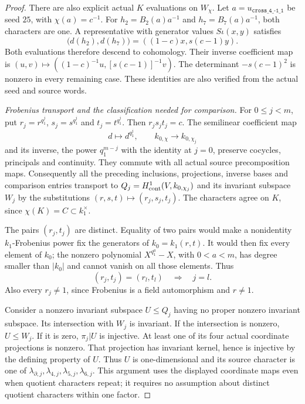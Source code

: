 \begin{proof}
There are also explicit actual $K$ evaluations
on $W_\chi$. Let $a=u_{\texttt{cross\_4\_-1\_1}}$
be seed $25$, with $\chi(a)=c^{-1}$.
For $h_2=B_2(a)a^{-1}$ and $h_7=B_7(a)a^{-1}$,
both characters are one. A representative with
generator values $S\iota(x,y)$ satisfies
\[
 \bigl(d(h_2),d(h_7)\bigr)=((1-c)x,s(c-1)y).
                                                               \tag{F.28.11}
\]
Both evaluations therefore descend to cohomology.
Their inverse coefficient map is
$(u,v)\mapsto((1-c)^{-1}u,[s(c-1)]^{-1}v)$.
The determinant $-s(c-1)^2$ is nonzero in every
remaining case. These identities are also
verified from the actual seed and source words.

\emph{Frobenius transport and the classification needed for comparison.}
For $0\leq j<m$, put
$r_j=r^{q_1^j}$, $s_j=s^{q_1^j}$ and
$t_j=t^{q_1^j}$. Then $r_js_jt_j=c$.
The semilinear coefficient map
\[
             d\longmapsto d^{q_1^j},\qquad
             k_{0,\chi}\longrightarrow k_{0,\chi_j}
                                                               \tag{F.28.12}
\]
and its inverse, the power $q_1^{m-j}$ with the
identity at $j=0$, preserve cocycles, principals
and continuity. They commute with all actual
source precomposition maps. Consequently all
the preceding inclusions, projections, inverse
bases and comparison entries transport to
$Q_j=H^1_{\rm cont}(V,k_{0,\chi_j})$ and its
invariant subspace $W_j$ by the substitutions
$(r,s,t)\mapsto(r_j,s_j,t_j)$.
The characters agree on $K$, since
$\chi(K)=C\subset k_1^\times$.

The pairs $(r_j,t_j)$ are distinct. Equality of
two pairs would make a nonidentity $k_1$-Frobenius
power fix the generators of $k_0=k_1(r,t)$.
It would then fix every element of $k_0$;
the nonzero polynomial $X^{q_1^a}-X$, with
$0<a<m$, has degree smaller than $|k_0|$ and
cannot vanish on all those elements. Thus
\[
                  (r_j,t_j)=(r_l,t_l)\quad\Longrightarrow\quad j=l.
                                                               \tag{F.28.13}
\]
Also every $r_j\ne1$, since Frobenius is a field
automorphism and $r\ne1$.

Consider a nonzero invariant subspace $U\leq Q_j$
having no proper nonzero invariant subspace.
Its intersection with $W_j$ is invariant.
If the intersection is nonzero, $U\leq W_j$.
If it is zero, $\pi_j|U$ is injective. At least
one of its four actual coordinate projections
is nonzero. That projection has invariant
kernel, hence is injective by the defining
property of $U$. Thus $U$ is one-dimensional
and its source character is one of
$\lambda_{\partial,j},\lambda_{4,j},
\lambda_{5,j},\lambda_{6,j}$.
This argument uses the displayed coordinate
maps even when quotient characters repeat;
it requires no assumption about distinct
quotient characters within one factor.


\end{proof}
